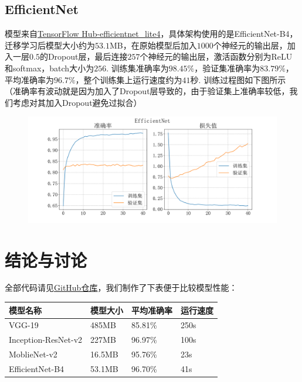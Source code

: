 \documentclass[12pt, a4paper, oneside]{ctexart}
\numberwithin{equation}{section}  %
\begin{document}
\subsection{EfficientNet}
模型来自\href{https://tfhub.dev/tensorflow/efficientnet/lite4/classification/2}{TensorFlow Hub-efficientnet\_lite4}，具体架构使用的是EfficientNet-B4，迁移学习后模型大小约为$53.1$MB，在原始模型后加入$1000$个神经元的输出层，加入一层$0.5$的Dropout层，最后连接$257$个神经元的输出层，激活函数分别为ReLU和softmax，batch大小为$256$. 训练集准确率为$98.45\%$，验证集准确率为$83.79\%$，平均准确率为$96.7\%$，整个训练集上运行速度约为$41$秒. 训练过程图如下图所示（准确率有波动就是因为加入了Dropout层导致的，由于验证集上准确率较低，我们考虑对其加入Dropout避免过拟合）\vspace*{-0.3cm}
\begin{figure}[htbp]
  \hspace*{-0.8cm}
  \centering
  \includegraphics[scale=0.5]{model/efficientnet_dropout.png}
\end{figure}

\section{结论与讨论}
全部代码请见\href{https://github.com/wty-yy/CVPR_homeworks/tree/master/code/hw4}{GitHub仓库}，我们制作了下表便于比较模型性能：
\renewcommand\arraystretch{0.8} %
\begin{table}[!htbp] %
    \centering %
    \begin{tabular}{p{4cm}<{\centering}p{3cm}<{\centering}p{3cm}<{\centering}p{3cm}<{\centering}} %
        \toprule
      \textbf{模型名称}       & \textbf{模型大小} & \textbf{平均准确率} & \textbf{运行速度} \\
        \midrule
VGG-19              & 485MB         & 85.81\%       & 250s          \\
Inception-ResNet-v2 & 227MB         & 96.97\%        & 100s          \\
MoblieNet-v2        & 16.5MB        & 95.76\%        & 23s           \\
EfficientNet-B4     & 53.1MB        & 96.70\%         & 41s         \\
        \bottomrule
    \end{tabular}
\end{table}
\end{document}
